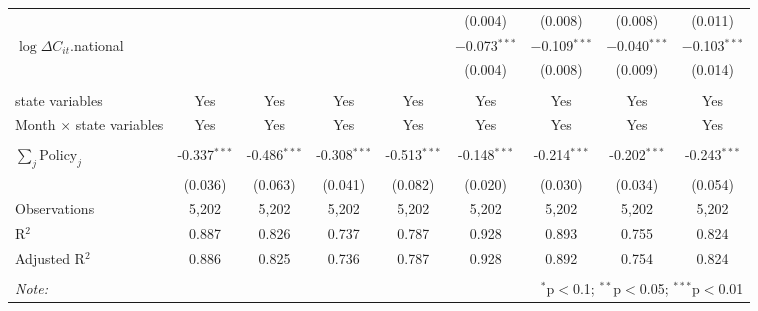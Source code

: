 \begin{tabular}{@{\extracolsep{1pt}}lcccccccc}
  &  &  &  &  & (0.004) & (0.008) & (0.008) & (0.011) \\ 
  $\log \Delta C_{it}$.national &  &  &  &  & $-$0.073$^{***}$ & $-$0.109$^{***}$ & $-$0.040$^{***}$ & $-$0.103$^{***}$ \\ 
  &  &  &  &  & (0.004) & (0.008) & (0.009) & (0.014) \\ 
 \hline \\[-1.8ex] 
state variables & Yes & Yes & Yes & Yes & Yes & Yes & Yes & Yes \\ 
Month $\times$ state variables & Yes & Yes & Yes & Yes & Yes & Yes & Yes & Yes \\ 
\hline \\[-1.8ex] 
$\sum_j \mathrm{Policy}_j$ & -0.337$^{***}$ & -0.486$^{***}$ & -0.308$^{***}$ & -0.513$^{***}$ & -0.148$^{***}$ & -0.214$^{***}$ & -0.202$^{***}$ & -0.243$^{***}$ \\ 
 & (0.036) & (0.063) & (0.041) & (0.082) & (0.020) & (0.030) & (0.034) & (0.054) \\ 
Observations & 5,202 & 5,202 & 5,202 & 5,202 & 5,202 & 5,202 & 5,202 & 5,202 \\ 
R$^{2}$ & 0.887 & 0.826 & 0.737 & 0.787 & 0.928 & 0.893 & 0.755 & 0.824 \\ 
Adjusted R$^{2}$ & 0.886 & 0.825 & 0.736 & 0.787 & 0.928 & 0.892 & 0.754 & 0.824 \\ 
\hline 
\hline \\[-1.8ex] 
\textit{Note:}  & \multicolumn{8}{r}{$^{*}$p$<$0.1; $^{**}$p$<$0.05; $^{***}$p$<$0.01} \\ 
\end{tabular} 